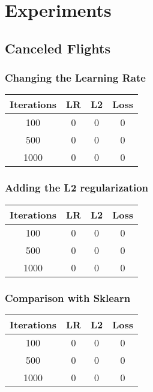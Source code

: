\documentclass[
	letterpaper, %
	10pt, %
]{class}
\begin{document}
\section{Experiments}

\subsection{Canceled Flights}

\subsubsection{Changing the Learning Rate}

\begin{center}
	\begin{tabular}{ |c|c|c|c| }
		\hline
		Iterations & LR & L2 & Loss \\
		\hline
		100        & 0  & 0  & 0    \\
		500        & 0  & 0  & 0    \\
		1000       & 0  & 0  & 0    \\
		\hline
	\end{tabular}
\end{center}

\subsubsection{Adding the L2 regularization}

\begin{center}
	\begin{tabular}{ |c|c|c|c| }
		\hline
		Iterations & LR & L2 & Loss \\
		\hline
		100        & 0  & 0  & 0    \\
		500        & 0  & 0  & 0    \\
		1000       & 0  & 0  & 0    \\
		\hline
	\end{tabular}
\end{center}

\subsubsection{Comparison with Sklearn}

\begin{center}
	\begin{tabular}{ |c|c|c|c| }
		\hline
		Iterations & LR & L2 & Loss \\
		\hline
		100        & 0  & 0  & 0    \\
		500        & 0  & 0  & 0    \\
		1000       & 0  & 0  & 0    \\
		\hline
	\end{tabular}
\end{center}
\end{document}
